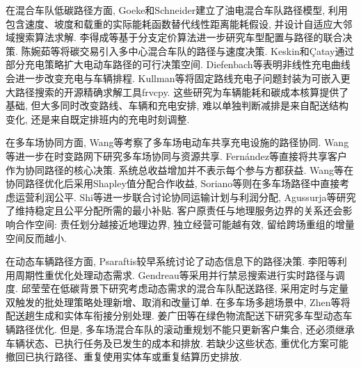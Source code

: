 \documentclass{setp-new}
\begin{document}
在混合车队低碳路径方面, Goeke和Schneider\cite{ref:27}建立了油电混合车队路径模型,
利用包含速度、坡度和载重的实际能耗函数替代线性距离能耗假设,
并设计自适应大邻域搜索算法求解.
李得成等\cite{ref:6}基于分支定价算法进一步研究车型配置与路径的联合决策.
陈婉茹等\cite{ref:23}将碳交易引入多中心混合车队的路径与速度决策.
Keskin和\c{C}atay\cite{ref:45}通过部分充电策略扩大电动车路径的可行决策空间.
Diefenbach等\cite{ref:46}表明非线性充电曲线会进一步改变充电与车辆排程.
Kullman等\cite{ref:73}将固定路线充电子问题封装为可嵌入更大路径搜索的开源精确求解工具frvcpy.
这些研究为车辆能耗和碳成本核算提供了基础,
但大多同时改变路线、车辆和充电安排,
难以单独判断减排是来自配送结构变化, 还是来自既定排班内的充电时刻调整.

在多车场协同方面, Wang等\cite{ref:7}考察了多车场电动车共享充电设施的路径协同.
Wang等\cite{ref:25}进一步在时变路网下研究多车场协同与资源共享.
Fern\'{a}ndez等\cite{ref:49}直接将共享客户作为协同路径的核心决策.
系统总收益增加并不表示每个参与方都获益.
Wang等\cite{ref:7}在协同路径优化后采用Shapley值分配合作收益,
Soriano等\cite{ref:8}则在多车场路径中直接考虑运营利润公平.
Shi等\cite{ref:9}进一步联合讨论协同运输计划与利润分配,
Agussurja等\cite{ref:10}研究了维持稳定且公平分配所需的最小补贴.
客户原责任与地理服务边界的关系还会影响合作空间:
责任划分越接近地理边界, 独立经营可能越有效,
留给跨场重组的增量空间反而越小.

在动态车辆路径方面, Psaraftis\cite{ref:14}较早系统讨论了动态信息下的路径决策.
李阳等\cite{ref:18}利用周期性重优化处理动态需求.
Gendreau等\cite{ref:22}采用并行禁忌搜索进行实时路径与调度.
邱莹莹\cite{ref:71}在低碳背景下研究考虑动态需求的混合车队配送路径,
采用定时与定量双触发的批处理策略处理新增、取消和改量订单.
在多车场多趟场景中, Zhen等\cite{ref:44}将配送趟生成和实体车衔接分别处理.
姜广田等\cite{ref:51}在绿色物流配送下研究多车型动态车辆路径优化.
但是, 多车场混合车队的滚动重规划不能只更新客户集合,
还必须继承车辆状态、已执行任务及已发生的成本和排放.
若缺少这些状态, 重优化方案可能撤回已执行路径、重复使用实体车或重复结算历史排放.
\end{document}
